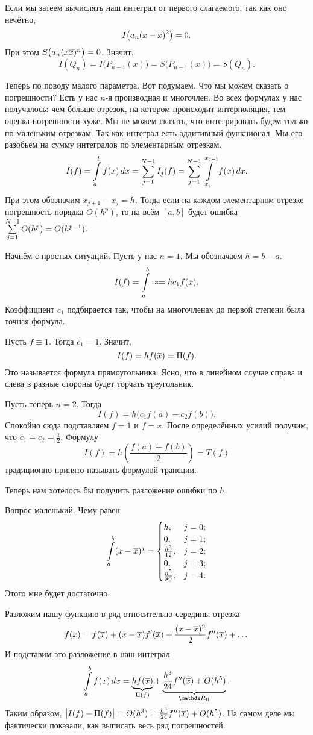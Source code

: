 Если мы затеем вычислять наш интеграл от первого слагаемого, так как оно нечётно,
\[
  I\big(a_n(x-\overline{x})^2\big) = 0.
\]
При этом $S\big(a_n(x\overline{x})^n\big) = 0$. Значит,
\[
  I(Q_n) = I\big(P_{n-1}(x)\big) = S\big(P_{n-1}(x)\big) = S(Q_n).
\]

Теперь по поводу малого параметра. Вот подумаем. Что мы можем сказать о погрешности? Есть у нас $n$-я производная и многочлен. Во всех формулах у нас получалось: чем больше отрезок, на котором происходит интерполяция, тем оценка погрешности хуже. Мы не можем сказать, что интегрировать будем только по маленьким отрезкам. Так как интеграл есть аддитивный функционал. Мы его разобьём на сумму интегралов по элементарным отрезкам.
\[
  I(f) = \int\limits_a^b f(x)\,dx = \sum\limits_{j = 1}^{N-1} I_j(f) = \sum\limits_{j = 1}^{N-1} \int\limits_{x_j}^{x_{j+1}} f(x)\,dx.
\]
 При этом обозначим $x_{j+1}-x_j = h$. Тогда если на каждом элементарном отрезке погрешность порядка $O(h^p)$, то на всём $[a,b]$ будет ошибка $\sum\limits_{j = 1}^{N-1} O(h^p) = O(h^{p-1})$.

Начнём с простых ситуаций.
Пусть у нас $n=1$. Мы обозначаем $h = b-a$.
\[
  I(f) = \int\limits_a^b \approx = h c_1 f(\overline{x}).
\]
Коэффициент $c_1$ подбирается так, чтобы на многочленах до первой степени была точная формула.

Пусть $f\equiv 1$. Тогда $c_1=1$. Значит,
\[
  I(f) = h f(\overline{x}) = \Pi(f).
\]
Это называется формула прямоугольника. Ясно, что в линейном случае справа и слева в разные стороны будет торчать треугольник.

Пусть теперь $n=2$. Тогда
\[
  I(f) = h\big(c_1 f(a) - c_2 f(b)\big).
\]
Спокойно сюда подставляем $f=1$ и $f=x$. После определённых усилий получим, что $c_1 = c_2 = \frac12$.
Формулу
\[
  I(f) = h\left( \frac{f(a) + f(b)}{2} \right) = T(f)
\]
традиционно принято называть формулой трапеции.

Теперь нам хотелось бы получить разложение ошибки по $h$.

Вопрос маленький. Чему равен
\[
  \int\limits_a^b (x-\overline{x})^j = \begin{cases}
  h,&j=0;\\
  0,&j=1;\\
  \frac{h^3}{12},&j=2;\\
  0,&j=3;\\
  \frac{h^5}{80},&j=4.
\end{cases}
\]
Этого мне будет достаточно.

Разложим нашу функцию в ряд относительно середины отрезка
\[
  f(x) = f(\overline{x}) + (x-\overline{x}) f'(\overline{x}) + \frac{(x-\overline{x})^2}2f''(\overline{x}) + \dots
\]
И подставим это разложение в наш интеграл
\[
  \int\limits_a^b f(x)\,dx = \underbrace{h f(\ol x)}_{\Pi(f)} + \underbrace{\frac{h^3}{24} f''(\ol x) + O(h^5)}_{\R_\Pi}.
\]
Таким образом, $\big|I(f) - \Pi(f)\big| = O(h^3) = \frac{h^3}{24} f''(\overline{x}) + O(h^5)$. На самом деле мы фактически показали, как выписать весь ряд погрешностей.

